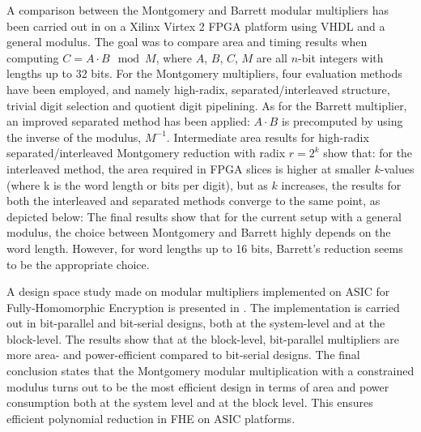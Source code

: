 \documentclass[11pt,
  titlepage=false,
  abstract=on,
]{scrreprt}
\begin{document}
A comparison between the Montgomery and Barrett modular multipliers has been carried out in \cite{kong2006comparison} on a Xilinx Virtex 2 FPGA platform using VHDL and a general modulus.
The goal was to compare area and timing results when computing $C = A \cdot B \mod M$, where $A$, $B$, $C$, $M$ are all $n$-bit integers with lengths up to 32 bits.
For the Montgomery multipliers, four evaluation methods have been employed, and namely high-radix, separated/interleaved structure, trivial digit selection and quotient digit pipelining.
As for the Barrett multiplier, an improved separated method has been applied: $A \cdot B$ is precomputed by using the inverse of the modulus, $M^{-1}$.
Intermediate area results for high-radix separated/interleaved Montgomery reduction with radix $r = 2^{k}$ show that: for the interleaved  method, the area required in FPGA slices is higher
at smaller $k$-values (where k is the word length or bits per digit), but as $k$ increases, the results for both the interleaved and separated methods converge to the same point, as depicted below:
The final results show that  for the current setup with a general modulus, the choice between Montgomery and Barrett highly depends on the word length. However, for word lengths up to 16 bits,
Barrett's reduction seems to be the appropriate choice.

A design space study made on modular multipliers implemented on ASIC for Fully-Homomorphic Encryption is presented in \cite{10129292}. The implementation is carried out in bit-parallel and bit-serial
designs, both at the system-level and at the block-level. The results show that at the block-level, bit-parallel multipliers are more area- and power-efficient compared to bit-serial designs.
The final conclusion states that the Montgomery modular multiplication with a constrained modulus turns out to be the most efficient design in terms of area and power consumption both at the system
level and at the block level. This ensures efficient polynomial reduction in FHE on ASIC platforms.




\end{document}
